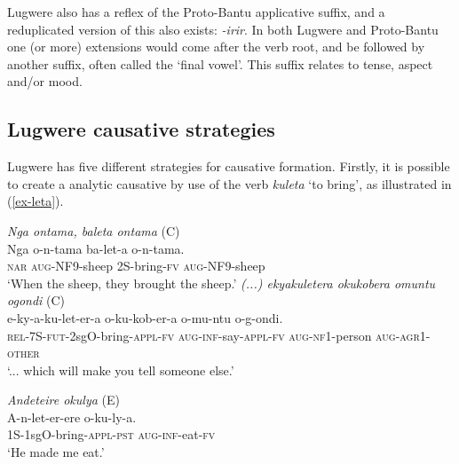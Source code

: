 \documentclass[output=paper,colorlinks,citecolor=brown,draftmode]{langscibook}
\begin{document}
Lugwere also has a reflex of the Proto-Bantu applicative suffix, and a reduplicated version of this also exists: \emph{-irir}. In both Lugwere and Proto-Bantu one (or more) extensions would come after the verb root, and be followed by another suffix, often called the `final vowel'. This suffix relates to tense, aspect and/or mood. 

\subsection{Lugwere causative strategies}

Lugwere has five different strategies for causative formation. Firstly, it is possible to create a analytic causative by use of the verb \emph{kuleta} `to bring', as illustrated in (\ref{ex-leta}).

\newpage
\ea
\begin{xlist}   \label{ex-leta}
 \ex \emph{Nga ontama, baleta ontama} (C)\\
  \gll  Nga o-n-tama ba-let-a o-n-tama. \\ 
\textsc{nar} \textsc{aug}-NF9-sheep 2S-bring-\textsc{fv} \textsc{aug}-NF9-sheep\\
    \glt  `When the sheep, they brought the sheep.' 
 \ex \emph{ (...) ekyakuletera okukobera omuntu ogondi} (C)\\
  \gll  e-ky-a-ku-let-er-a o-ku-kob-er-a o-mu-ntu o-g-ondi. \\ 
\textsc{rel}-7S-\textsc{fut}-2sgO-bring-\textsc{appl-fv} \textsc{aug-inf-}say-\textsc{appl-fv} \textsc{aug-nf1}-person \textsc{aug-agr1-other} \\
    \glt  `... which will make you tell someone else.' 
 
 \ex \emph{ Andeteire okulya} (E) \\
  \gll A-n-let-er-ere o-ku-ly-a. \\ 
1S-1sgO-bring-\textsc{appl}-\textsc{pst} \textsc{aug-inf}-eat-\textsc{fv} \\
    \glt  `He made me eat.' 

      \end{xlist}     
      \z


\end{document}
